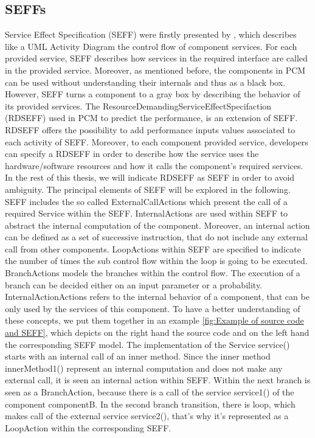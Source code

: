 \subsection{SEFFs}
\label{sec: SEFFs}
Service Effect Specification (SEFF) were firstly presented by \cite{koziolek2006parameter}, which describes like a UML Activity Diagram the control flow of component services. For each provided service, SEFF describes how services in the required interface are called in the provided service. Moreover, as mentioned before, the components in PCM can be used without understanding their internals and thus as a black box. However, SEFF turns a component to a gray box by describing the behavior of its provided services.
The ResourceDemandingServiceEffectSpecifaction (RDSEFF) used in PCM to predict the performance, is an extension of SEFF. RDSEFF offers the possibility to add performance inputs values associated to each activity of SEFF. Moreover, to each component provided service, developers can specify a RDSEFF in order to describe how the service uses the hardware/software resources and how it calls the component's required services. 
In the rest of this thesis, we will indicate RDSEFF as SEFF in order to avoid ambiguity. The principal elements of SEFF will be explored in the following. SEFF includes the so called ExternalCallActions which present the call of a required Service within the SEFF. InternalActions are used within SEFF to abstract the internal computation of the component. Moreover, an internal action can be defined as a set of successive instruction, that do not include any external call from other components. LoopActions within SEFF are specified to indicate the number of times the sub control flow within the loop is going to be executed. BranchActions models the branches within the control flow. The execution of a branch can be decided either on an input parameter or a probability. InternalActionActions refers to the internal behavior of a component, that can be only used by the services of this component. 
To have a better understanding of these concepts, we put them together in an example \ref{fig:Example of source code and SEFF}, which depicts on the right hand the source code and on the left hand the corresponding SEFF model. The implementation of the Service service() starts with an internal call of an inner method. Since the inner method innerMethod1() represent an internal computation and does not make any external call, it is seen an internal action within SEFF. Within the next branch is seen as a BranchAction, because there is a call of the service service1() of the component componentB. In the second branch transition, there is loop, which makes call of the external service service2(), that’s why it’s represented as a LoopAction within the corresponding SEFF. 


